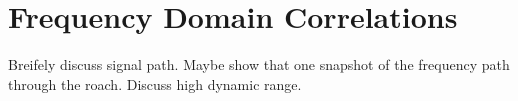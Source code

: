 \section{Frequency Domain Correlations}
Breifely discuss signal path. 
Maybe show that one snapshot of the frequency path through the roach. 
Discuss high dynamic range.
